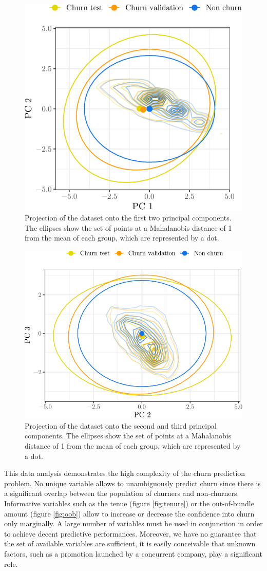 \begin{figure}
    \centering
    \includegraphics[width=0.63\linewidth]{figures/pca_1_2.pdf}
    \caption{Projection of the dataset onto the first two principal components.
    The ellipses show the set of points at a Mahalanobis distance of 1 from the
    mean of each group, which are represented by a dot.}
    \label{fig:pca_1_2}
\end{figure}

\begin{figure}
    \centering
    \includegraphics[width=0.8\linewidth]{figures/pca_2_3.pdf}
    \caption{Projection of the dataset onto the second and third principal
    components. The ellipses show the set of points at a Mahalanobis distance of
    1 from the mean of each group, which are represented by a dot.}
    \label{fig:pca_2_3}
\end{figure}

This data analysis demonstrates the high complexity of the churn prediction
problem. No unique variable allows to unambiguously predict churn since there is
a significant overlap between the population of churners and non-churners.
Informative variables such as the tenue (figure \ref{fig:tenure}) or the
out-of-bundle amount (figure \ref{fig:oob}) allow to increase or decrease the
confidence into churn only marginally. A large number of variables must be used
in conjunction in order to achieve decent predictive performances. Moreover, we
have no guarantee that the set of available variables are sufficient, it is
easily conceivable that unknown factors, such as a promotion launched by a
concurrent company, play a significant role.

